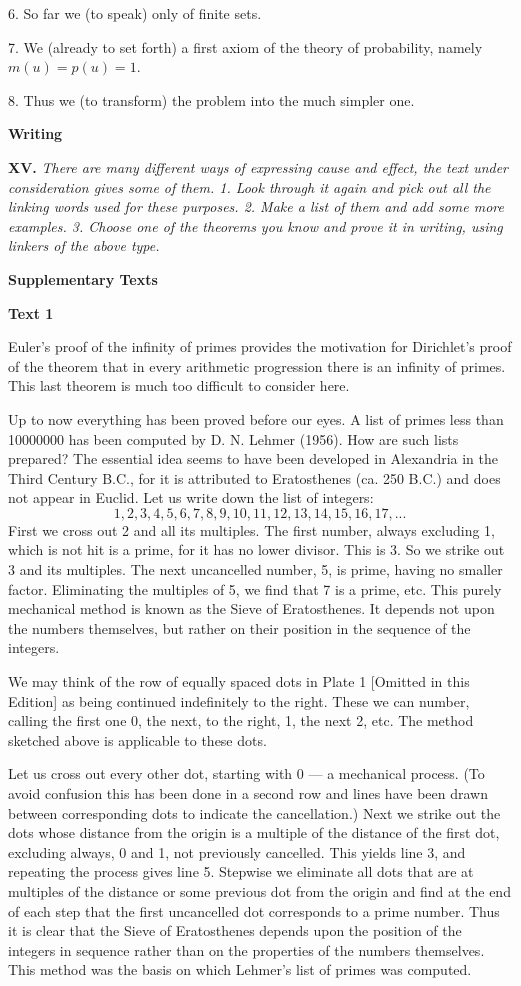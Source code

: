 \documentclass[a4paper]{article}
\newcommand{\ESect}[1]{\medskip\par{\large \textbf{#1}}\par}
\newcommand{\ETask}[2]{\medskip\par\textbf{#1.} \textit{#2}\par}
\begin{document}
6. So far we (to speak) only of finite sets.

7. We (already to set forth) a first axiom of the theory of probability, namely $m(u) = p(u) = 1$.

8. Thus we (to transform) the problem into the much simpler one.

\ESect{Writing}

\ETask{XV}{There are many different ways of expressing cause and effect, the text under consideration gives some of them.
1. Look through it again and pick out all the linking words used for these purposes. 2. Make a list of them and add some more
examples. 3. Choose one of the theorems you know and prove it in writing, using linkers of the above type.}

\ESect{Supplementary Texts}

\ESect{Text 1}
Euler's proof of the infinity of primes provides the motivation for Dirichlet's proof of the theorem that in every arithmetic
progression there is an infinity of primes. This last theorem is much too difficult to consider here.

Up to now everything has been proved before our eyes. A list of primes less than 10000000 has been computed by D. N. Lehmer (1956).
How are such lists prepared? The essential idea seems to have been developed in Alexandria in the Third Century B.C., for it
is attributed to Eratosthenes (ca. 250 B.C.) and does not appear in Euclid. Let us write down the list of integers:
$$1,2,3,4,5,6,7,8,9,10,11,12,13,14,15,16,17,...$$
First we cross out 2 and all its multiples. The first number, always excluding 1, which is not hit is a prime, for it has no
lower divisor. This is 3. So we strike out 3 and its multiples. The next uncancelled number, 5, is prime, having no smaller
factor. Eliminating the multiples of 5, we find that 7 is a prime, etc. This purely mechanical method is known as the Sieve
of Eratosthenes. It depends not upon the numbers themselves, but rather on their position in the sequence of the integers.

We may think of the row of equally spaced dots in Plate 1 [Omitted in this Edition] as being continued indefinitely to the
right. These we can number, calling the first one 0, the next, to the right, 1, the next 2, etc. The method sketched above
is applicable to these dots.

Let us cross out every other dot, starting with 0 --- a mechanical process. (To avoid confusion this has been done in a second
row and lines have been drawn between corresponding dots to indicate the cancellation.) Next we strike out the dots whose
distance from the origin is a multiple of the distance of the first dot, excluding always, 0 and 1, not previously cancelled.
This yields line 3, and repeating the process gives line 5. Stepwise we eliminate all dots that are at multiples of the distance
or some previous dot from the origin and find at the end of each step that the first uncancelled dot corresponds to a prime number.
Thus it is clear that the Sieve of Eratosthenes depends upon the position of the integers in sequence rather than on the
properties of the numbers themselves. This method was the basis on which Lehmer's list of primes was computed.
\end{document}
